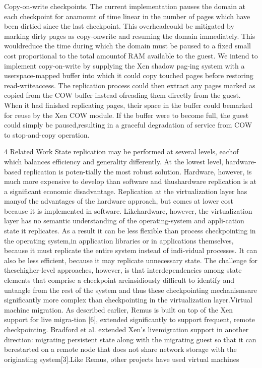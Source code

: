 Copy-on-write checkpoints. The current implementation pauses the domain at each checkpoint for anamount of time linear in the number of pages which have
been dirtied since the last checkpoint. This overheadcould be mitigated by marking dirty pages as copy-onwrite and resuming the domain immediately. This wouldreduce the time during which the domain must be paused
to a fixed small cost proportional to the total amountof RAM available to the guest. We intend to implement copy-on-write by supplying the Xen shadow pag-ing system with a userspace-mapped buffer into which
it could copy touched pages before restoring read-writeaccess. The replication process could then extract any
pages marked as copied from the COW buffer instead ofreading them directly from the guest. When it had finished replicating pages, their space in the buffer could bemarked for reuse by the Xen COW module. If the buffer
were to become full, the guest could simply be paused,resulting in a graceful degradation of service from COW
to stop-and-copy operation.

4 Related Work
State replication may be performed at several levels, eachof which balances efficiency and generality differently.
At the lowest level, hardware-based replication is poten-tially the most robust solution. Hardware, however, is
much more expensive to develop than software and thushardware replication is at a significant economic disadvantage. Replication at the virtualization layer has manyof the advantages of the hardware approach, but comes
at lower cost because it is implemented in software. Likehardware, however, the virtualization layer has no semantic understanding of the operating-system and appli-cation state it replicates. As a result it can be less flexible than process checkpointing in the operating system,in application libraries or in applications themselves, because it must replicate the entire system instead of indi-vidual processes. It can also be less efficient, because it
may replicate unnecessary state. The challenge for thesehigher-level approaches, however, is that interdependencies among state elements that comprise a checkpoint areinsidiously difficult to identify and untangle from the rest
of the system and thus these checkpointing mechanismsare significantly more complex than checkpointing in the
virtualization layer.Virtual machine migration. As described earlier, Remus is built on top of the Xen support for live migra-tion [6], extended significantly to support frequent, remote checkpointing. Bradford et al. extended Xen's livemigration support in another direction: migrating persistent state along with the migrating guest so that it can berestarted on a remote node that does not share network
storage with the originating system[3].Like Remus, other projects have used virtual machines

